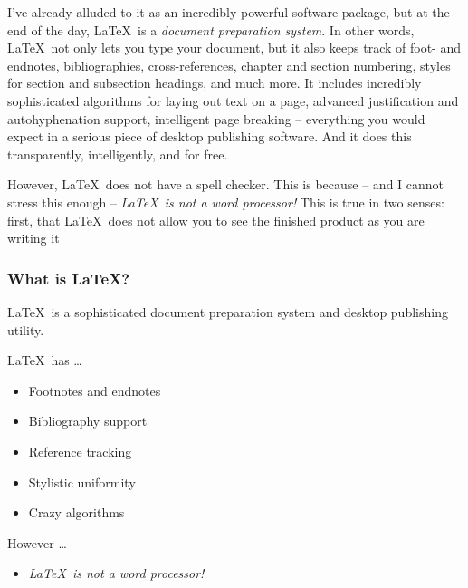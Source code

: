 \documentclass[ignorenonframetext]{beamer}
\begin{document}
I've already alluded to it as
an incredibly powerful software package, but at the end of the day,
\LaTeX\ is a \emph{document preparation system}.  In other words,
\LaTeX\ not only lets you type your document, but it also keeps track
of foot- and endnotes, bibliographies, cross-references, chapter and
section numbering, styles for section and subsection headings, and
much more.  It includes incredibly sophisticated algorithms for laying
out text on a page, advanced justification and autohyphenation
support, intelligent page breaking -- everything you would expect in a
serious piece of desktop publishing software.  And it does this
transparently, intelligently, and for free.

However, \LaTeX\ does not have a spell checker.  This is because --
and I cannot stress this enough -- \emph{\LaTeX\ is not a word
  processor!}  This is true in two senses: first, that \LaTeX\ does
not allow you to see the finished product as you are writing it

\begin{frame}
  \frametitle{What is \LaTeX?}
  \LaTeX\ is a sophisticated document preparation system and desktop
  publishing utility.
  \begin{block}{\LaTeX\ has \ldots}
    \begin{itemize}
    \item Footnotes and endnotes
    \item Bibliography support
    \item Reference tracking
    \item Stylistic uniformity
    \item Crazy algorithms
    \end{itemize}
  \end{block}
  \begin{block}{However \ldots}
    \begin{itemize}
    \item \emph{\LaTeX\ is not a word processor!}
    \end{itemize}
  \end{block}
\end{frame}
\end{document}
